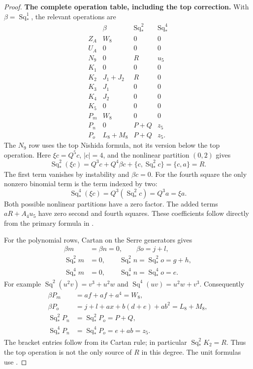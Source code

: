 \begin{proof}
\medskip\noindent
\textbf{The complete operation table, including the top correction.}
With $\beta=\operatorname{Sq}_*^1$, the relevant operations are
\[
\begin{array}{c|c|c|c}
 &\beta&\operatorname{Sq}_*^2&\operatorname{Sq}_*^4\\ \hline
 Z_A&W_8&0&0\\
 U_A&0&0&0\\
 N_9&0&R&u_5\\
 K_1&0&0&0\\
 K_2&J_1+J_2&R&0\\
 K_3&J_1&0&0\\
 K_4&J_2&0&0\\
 K_5&0&0&0\\
 P_m&W_8&0&0\\
 P_n&0&P+Q&z_5\\
 P_o&L_8+M_8&P+Q&z_5.
\end{array}
 \tag{D.2.20h6}
\]
The $N_9$ row uses the top Nishida formula, not its
version below the top operation. Here $\xi c=Q^5c$,
$|c|=4$, and the nonlinear partition $(0,2)$ gives
\[
 \operatorname{Sq}_*^2(\xi c)
 =Q^3c+Q^4\beta c+\{c,\operatorname{Sq}_*^2c\}
 =\{c,a\}=R.
 \tag{D.2.20h7}
\]
The first term vanishes by instability and $\beta c=0$.
For the fourth square the only nonzero binomial term
is the term indexed by two:
\[
 \operatorname{Sq}_*^4(\xi c)
 =Q^3(\operatorname{Sq}_*^2c)=Q^3a=\xi a.
 \tag{D.2.20h8}
\]
Both possible nonlinear partitions have a zero factor.
The added terms $aR+A_4u_5$ have zero second and fourth
squares. These coefficients follow directly from the
primary formula in
\cite[Chapter~III, Theorem~1.3(3), pp.~217--218]
{I_CohenLadaMay1976}.

For the polynomial rows, Cartan on the Serre generators gives
\[
\begin{split}
 \beta m&=\beta n=0,\qquad \beta o=j+l,\\
 \operatorname{Sq}_*^2m&=0,\qquad
 \operatorname{Sq}_*^2n=\operatorname{Sq}_*^2o=g+h,\\
 \operatorname{Sq}_*^4m&=0,\qquad
 \operatorname{Sq}_*^4n=\operatorname{Sq}_*^4o=e.
\end{split}
\]
For example
$\operatorname{Sq}^2(u^2v)=v^3+u^2w$
and $\operatorname{Sq}^4(uv)=u^2w+v^3$.
Consequently
\[
\begin{split}
 \beta P_m&=af+af+a^4=W_8,\\
 \beta P_o&=j+l+ax+b(d+e)+ab^2=L_8+M_8,\\
 \operatorname{Sq}_*^2P_n&=\operatorname{Sq}_*^2P_o=P+Q,\\
 \operatorname{Sq}_*^4P_n&=\operatorname{Sq}_*^4P_o=e+ab=z_5.
\end{split}
\]
The bracket entries follow from its Cartan rule;
in particular $\operatorname{Sq}_*^2K_2=R$.
Thus the top operation is not the only source of
$R$ in this degree. The unit formulas use
\cite[\S2, nos.~8--9]{I_Serre1953}.


\end{proof}
